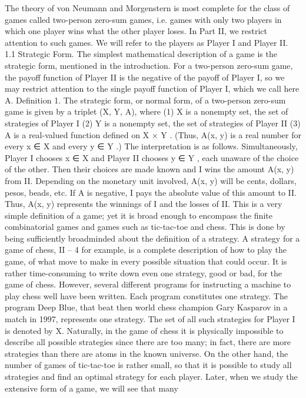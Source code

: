 The theory of von Neumann and Morgenstern is most complete for the class of games
called two-person zero-sum games, i.e. games with only two players in which one player
wins what the other player loses. In Part II, we restrict attention to such games. We will
refer to the players as Player I and Player II.
1.1 Strategic Form. The simplest mathematical description of a game is the strategic
form, mentioned in the introduction. For a two-person zero-sum game, the payoff
function of Player II is the negative of the payoff of Player I, so we may restrict attention
to the single payoff function of Player I, which we call here A.
Definition 1. The strategic form, or normal form, of a two-person zero-sum game is given
by a triplet (X, Y, A), where
(1) X is a nonempty set, the set of strategies of Player I
(2) Y is a nonempty set, the set of strategies of Player II
(3) A is a real-valued function defined on X × Y . (Thus, A(x, y) is a real number for
every x ∈ X and every y ∈ Y .)
The interpretation is as follows. Simultaneously, Player I chooses x ∈ X and Player
II chooses y ∈ Y , each unaware of the choice of the other. Then their choices are made
known and I wins the amount A(x, y) from II. Depending on the monetary unit involved,
A(x, y) will be cents, dollars, pesos, beads, etc. If A is negative, I pays the absolute value
of this amount to II. Thus, A(x, y) represents the winnings of I and the losses of II.
This is a very simple definition of a game; yet it is broad enough to encompass the
finite combinatorial games and games such as tic-tac-toe and chess. This is done by being
sufficiently broadminded about the definition of a strategy. A strategy for a game of chess,
II – 4
for example, is a complete description of how to play the game, of what move to make in
every possible situation that could occur. It is rather time-consuming to write down even
one strategy, good or bad, for the game of chess. However, several different programs for
instructing a machine to play chess well have been written. Each program constitutes one
strategy. The program Deep Blue, that beat then world chess champion Gary Kasparov
in a match in 1997, represents one strategy. The set of all such strategies for Player I is
denoted by X. Naturally, in the game of chess it is physically impossible to describe all
possible strategies since there are too many; in fact, there are more strategies than there
are atoms in the known universe. On the other hand, the number of games of tic-tac-toe
is rather small, so that it is possible to study all strategies and find an optimal strategy
for each player. Later, when we study the extensive form of a game, we will see that many

